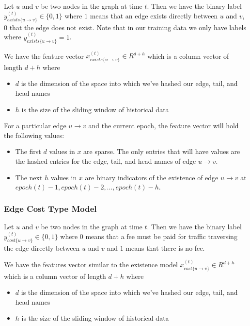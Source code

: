\documentclass{article} %
\begin{document}
Let $u$ and $v$ be two nodes in the graph at time $t$.  Then we have the
binary label $y_{exists\{u \rightarrow v\}}^{(t)} \in \{0,1\}$ where $1$
means that an edge exists directly between $u$ and $v$, $0$ that the edge
does not exist.  Note that in our training data we only have labels where
$y_{exists\{u \rightarrow v\}}^{(t)} = 1$.


We have the feature vector $x_{exists\{u \rightarrow v\}}^{(t)} \in R^{d+h}$
which is a column vector of length $d+h$ where
\begin{itemize}
\item $d$ is the dimension of the space into which we've hashed our edge,
  tail, and head names
\item $h$ is the size of the sliding window of historical data
\end{itemize}

For a particular edge $u \rightarrow v$ and the current epoch, the feature
vector will hold the following values:
\begin{itemize}
\item The first $d$ values in $x$ are sparse.  The only entries that will
  have values are the hashed entries for the edge, tail, and head names of
  edge $u \rightarrow v$.
\item The next $h$ values in $x$ are binary indicators of the existence of
  edge $u \rightarrow v$ at $epoch(t)-1, epoch(t)-2, ..., epoch(t)-h$.
\end{itemize}

\subsubsection{Edge Cost Type Model}
Let $u$ and $v$ be two nodes in the graph at time $t$.  Then we have the
binary label $y_{cost\{u \rightarrow v\}}^{(t)} \in \{0,1\}$ where $0$ means
that a fee must be paid for traffic traversing the edge directly between $u$
and $v$ and $1$ means that there is no fee.

We have the features vector similar to the existence model $x_{cost\{u
  \rightarrow v\}}^{(t)} \in R^{d+h}$ which is a column vector of length
$d+h$ where
\begin{itemize}
\item $d$ is the dimension of the space into which we've hashed our edge,
  tail, and head names
\item $h$ is the size of the sliding window of historical data
\end{itemize}
\end{document}
